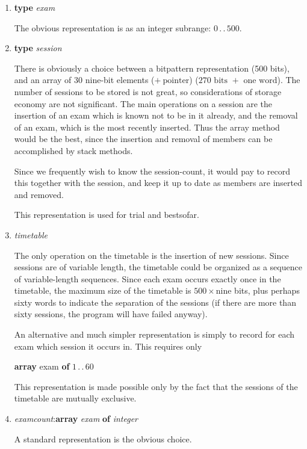 \begin{enumerate}[wide, nosep, label=(\arabic*)]
	\item \textbf{type} \textit{exam}

	\noindent
	The obvious representation is as an integer subrange: $0\,.\,.\,500$.

	\item \textbf{type} \textit{session}

	\noindent
	There is obviously a choice between a bitpattern representation (500 bits), and an array of 30 nine-bit elements ($+\ \text{pointer}$) ($270 \text{ bits } + \text{ one word}$). The number of sessions to be stored is not great, so considerations of storage  economy are not significant. The main operations on a session are the insertion of an exam which is known not to be in it already, and the removal of an exam, which is the most recently inserted. Thus the array method would be the best, since the insertion and removal of members can be accomplished by stack methods.

	Since we frequently wish to know the session-count, it would pay to record this together with the session, and keep it up to date as members are inserted and removed.

	This representation is used for trial and bestsofar.

	\item \textit{timetable}

	\noindent
	The only operation on the timetable is the insertion of new sessions. Since sessions are of variable length, the timetable could be organized as a sequence of variable-length sequences. Since each exam occurs exactly once in the timetable, the maximum size of the timetable is $500 \times \text{nine}$ bits, plus perhaps sixty words to indicate the separation of the sessions (if there are more than sixty sessions, the program will have failed anyway).

	An alternative and much simpler representation is simply to record for each exam which session it occurs in. This requires only

	\quad \textbf{array} exam \textbf{of} $1\,.\,.\,60$

	\noindent
	This representation is made possible only by the fact that the sessions of the timetable are mutually exclusive.

	\item \textit{examcount}:\textbf{array} \textit{exam} \textbf{of} \textit{integer}

	\noindent
	A standard representation is the obvious choice.


\end{enumerate}
